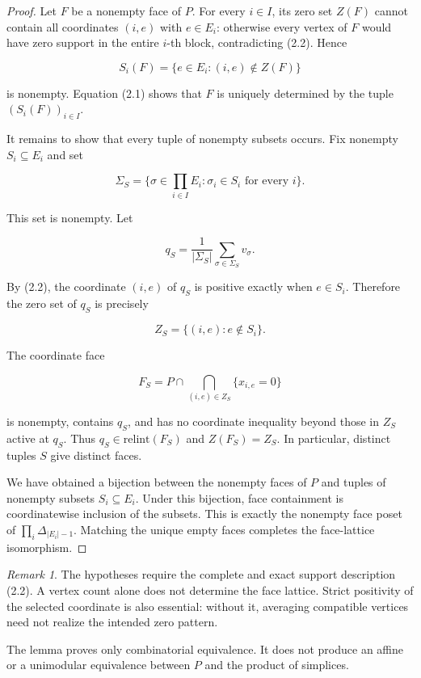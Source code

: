 \documentclass[11pt]{article}
\theoremstyle{remark}
\newtheorem{remark}[theorem]{Remark}
\numberwithin{equation}{section}
\begin{document}
\begin{proof}

Let $F$ be a nonempty face of $P$. For every $i\in I$, its zero set $Z(F)$
cannot contain all coordinates $(i,e)$ with $e\in E_i$: otherwise every
vertex of $F$ would have zero support in the entire $i$-th block, contradicting
(2.2). Hence

\nopagebreak[4]
\[
S_i(F)=\{e\in E_i:(i,e)\notin Z(F)\}
\]

is nonempty. Equation (2.1) shows that $F$ is uniquely determined by the tuple
$(S_i(F))_{i\in I}$.

It remains to show that every tuple of nonempty subsets occurs. Fix nonempty
$S_i\subseteq E_i$ and set

\nopagebreak[4]
\[
\Sigma_S=\{\sigma\in\prod_{i\in I}E_i:
\sigma_i\in S_i\text{ for every }i\}.
\]

This set is nonempty. Let

\nopagebreak[4]
\[
q_S=\frac{1}{|\Sigma_S|}\sum_{\sigma\in\Sigma_S}v_\sigma.
\]

By (2.2), the coordinate $(i,e)$ of $q_S$ is positive exactly when
$e\in S_i$. Therefore the zero set of $q_S$ is precisely

\nopagebreak[4]
\[
Z_S=\{(i,e):e\notin S_i\}.
\]

The coordinate face

\nopagebreak[4]
\[
F_S=P\cap\bigcap_{(i,e)\in Z_S}\{x_{i,e}=0\}
\]

is nonempty, contains $q_S$, and has no coordinate inequality beyond those in
$Z_S$ active at $q_S$. Thus $q_S\in\mathrm{relint}(F_S)$ and
$Z(F_S)=Z_S$. In particular, distinct tuples $S$ give distinct faces.

We have obtained a bijection between the nonempty faces of $P$ and tuples of
nonempty subsets $S_i\subseteq E_i$. Under this bijection, face containment is
coordinatewise inclusion of the subsets. This is exactly the nonempty face
poset of $\prod_i\Delta_{|E_i|-1}$. Matching the unique empty faces completes
the face-lattice isomorphism.
\end{proof}


\Needspace{0.32\textheight}
\begin{remark}

The hypotheses require the complete and exact support description (2.2). A
vertex count alone does not determine the face lattice. Strict positivity of
the selected coordinate is also essential: without it, averaging compatible
vertices need not realize the intended zero pattern.

The lemma proves only combinatorial equivalence. It does not produce an affine
or a unimodular equivalence between $P$ and the product of simplices.

\end{remark}
\end{document}
